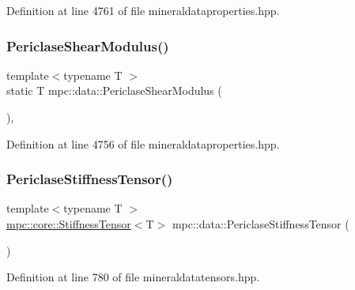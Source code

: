 Definition at line 4761 of file mineraldataproperties.\+hpp.

\mbox{\label{namespacempc_1_1data_a37b7b1ff47bd059579e86f9d992d2d3d}} 
\subsubsection{\texorpdfstring{Periclase\+Shear\+Modulus()}{PericlaseShearModulus()}}
{\footnotesize\ttfamily template$<$typename T $>$ \\
static T mpc\+::data\+::\+Periclase\+Shear\+Modulus (\begin{DoxyParamCaption}{ }\end{DoxyParamCaption})\hspace{0.3cm}{\ttfamily [inline]}, {\ttfamily [static]}}



Definition at line 4756 of file mineraldataproperties.\+hpp.

\mbox{\label{namespacempc_1_1data_a123f3e6d4956f31c293ae67908eed716}} 
\subsubsection{\texorpdfstring{Periclase\+Stiffness\+Tensor()}{PericlaseStiffnessTensor()}}
{\footnotesize\ttfamily template$<$typename T $>$ \\
\mbox{\hyperlink{structmpc_1_1core_1_1_stiffness_tensor}{mpc\+::core\+::\+Stiffness\+Tensor}}$<$T$>$ mpc\+::data\+::\+Periclase\+Stiffness\+Tensor (\begin{DoxyParamCaption}{ }\end{DoxyParamCaption})}



Definition at line 780 of file mineraldatatensors.\+hpp.

\mbox{\label{namespacempc_1_1data_a73da7705d53153e252c5936f1a81778d}} 

